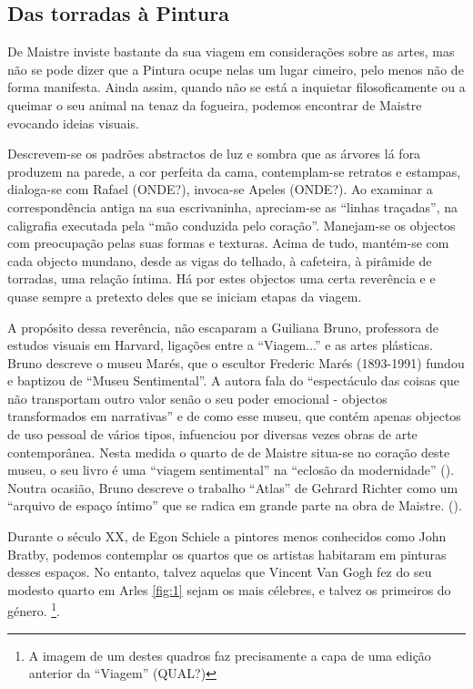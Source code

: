 \documentclass[12pt]{article}
\begin{document}
\subsection{Das torradas à Pintura}

De Maistre inviste bastante da sua viagem em considerações sobre as
artes, mas não se pode dizer que a Pintura ocupe nelas um lugar
cimeiro, pelo menos não de forma manifesta. Ainda assim, quando não se
está a inquietar filosoficamente ou a queimar o seu animal na tenaz da
fogueira, podemos encontrar de Maistre evocando ideias visuais.

Descrevem-se os padrões abstractos de luz e sombra que as árvores lá
fora produzem na parede, a cor perfeita da cama, contemplam-se
retratos e estampas, dialoga-se com Rafael (ONDE?), invoca-se Apeles
(ONDE?). Ao examinar a correspondência antiga na sua escrivaninha,
apreciam-se as ``linhas traçadas'', na caligrafia executada pela ``mão
conduzida pelo coração''. Manejam-se os objectos com preocupação pelas
suas formas e texturas. Acima de tudo, mantém-se com cada objecto
mundano, desde as vigas do telhado, à cafeteira, à pirâmide de
torradas, uma relação íntima. Há por estes objectos uma certa
reverência e e quase sempre a pretexto deles que se iniciam etapas da
viagem.

A propósito dessa reverência, não escaparam a Guiliana Bruno,
professora de estudos visuais em Harvard, ligações entre a
``Viagem...'' e as artes plásticas. Bruno descreve o museu Marés, que
o escultor Frederic Marés (1893-1991) fundou e baptizou de ``Museu
Sentimental''. A autora fala do ``espectáculo das coisas que não
transportam outro valor senão o seu poder emocional - objectos
transformados em narrativas'' e de como esse museu, que contém apenas
objectos de uso pessoal de vários tipos, infuenciou por diversas vezes
obras de arte contemporânea. Nesta medida o quarto de de Maistre
situa-se no coração deste museu, o seu livro é uma ``viagem
sentimental'' na ``eclosão da modernidade''
(\cite[p.133]{bruno2002atlas}). Noutra ocasião, Bruno descreve o
trabalho ``Atlas'' de Gehrard Richter como um ``arquivo de espaço
íntimo'' que se radica em grande parte na obra de
Maistre. (\cite[p.254]{bruno2002atlas}).

Durante o século XX, de Egon Schiele a pintores menos conhecidos como
John Bratby, podemos contemplar os quartos que os artistas habitaram
em pinturas desses espaços. No entanto, talvez aquelas que Vincent Van
Gogh fez do seu modesto quarto em Arles \ref{fig:1} sejam os mais
célebres, e talvez os primeiros do género. \footnote{A imagem de um
  destes quadros faz precisamente a capa de uma edição anterior da
  ``Viagem'' (QUAL?)}.
\end{document}

